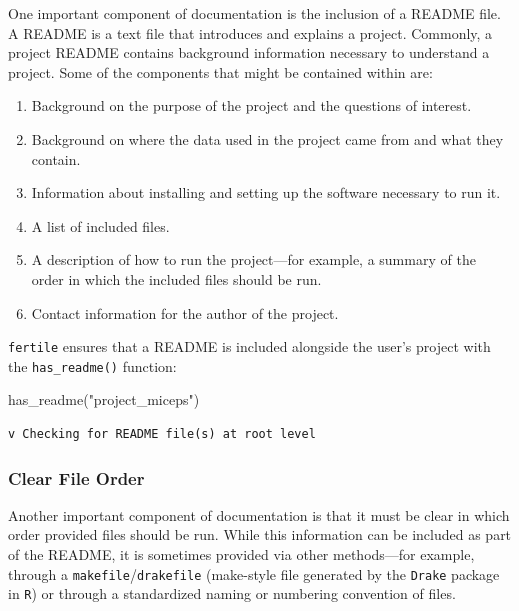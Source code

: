 \documentclass[12pt,twoside]{reedthesis}
\newenvironment{Shaded}{\begin{snugshade}}{\end{snugshade}}
\newcommand{\FunctionTok}[1]{\textcolor[rgb]{0.00,0.00,0.00}{#1}}
\newcommand{\NormalTok}[1]{#1}
\newcommand{\StringTok}[1]{\textcolor[rgb]{0.31,0.60,0.02}{#1}}
\providecommand{\tightlist}{%
  \setlength{\itemsep}{0pt}\setlength{\parskip}{0pt}}
\begin{document}
One important component of documentation is the inclusion of a README file. A README is a text file that introduces and explains a project. Commonly, a project README contains background information necessary to understand a project. Some of the components that might be contained within are:
\begin{enumerate}
\def\labelenumi{\arabic{enumi}.}
\tightlist
\item
  Background on the purpose of the project and the questions of interest.
\item
  Background on where the data used in the project came from and what they contain.
\item
  Information about installing and setting up the software necessary to run it.
\item
  A list of included files.
\item
  A description of how to run the project---for example, a summary of the order in which the included files should be run.
\item
  Contact information for the author of the project.
\end{enumerate}
\texttt{fertile} ensures that a README is included alongside the user's project with the \texttt{has\_readme()} function:
\begin{Shaded}
\begin{Highlighting}[]
\FunctionTok{has\_readme}\NormalTok{(}\StringTok{"project\_miceps"}\NormalTok{)}
\end{Highlighting}
\end{Shaded}
\begin{verbatim}
v Checking for README file(s) at root level
\end{verbatim}
\hypertarget{clear-file-order}{%
\subsubsection{Clear File Order}\label{clear-file-order}}

Another important component of documentation is that it must be clear in which order provided files should be run. While this information can be included as part of the README, it is sometimes provided via other methods---for example, through a \texttt{makefile}/\texttt{drakefile} (make-style file generated by the \texttt{Drake} package in \texttt{R}) or through a standardized naming or numbering convention of files.
\end{document}
